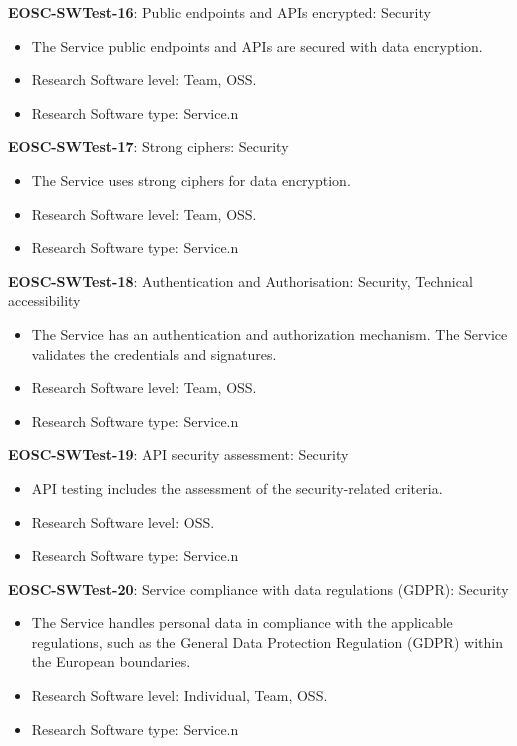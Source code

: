 \textbf{EOSC-SWTest-16}: Public endpoints and APIs encrypted: Security

\begin{itemize}
    \item The Service public endpoints and APIs are secured with data encryption. \cite{orviz_fernandez_eosc-synergy_2020}
    \item Research Software level: Team, OSS.
    \item Research Software type: Service.n\end{itemize}

\textbf{EOSC-SWTest-17}: Strong ciphers: Security

\begin{itemize}
    \item The Service uses strong ciphers for data encryption. \cite{orviz_fernandez_eosc-synergy_2020}
    \item Research Software level: Team, OSS.
    \item Research Software type: Service.n\end{itemize}

\textbf{EOSC-SWTest-18}: Authentication and Authorisation: Security, Technical accessibility

\begin{itemize}
    \item The Service has an authentication and authorization mechanism. The Service validates the credentials and signatures. \cite{shepherdson_cessda_2019,orviz_fernandez_eosc-synergy_2020}
    \item Research Software level: Team, OSS.
    \item Research Software type: Service.n\end{itemize}

\textbf{EOSC-SWTest-19}: API security assessment: Security

\begin{itemize}
    \item API testing includes the assessment of the security-related criteria. \cite{orviz_fernandez_eosc-synergy_2020}
    \item Research Software level: OSS.
    \item Research Software type: Service.n\end{itemize}

\textbf{EOSC-SWTest-20}: Service compliance with data regulations (GDPR): Security

\begin{itemize}
    \item The Service handles personal data in compliance with the applicable regulations, such as the General Data Protection Regulation (GDPR) within the European boundaries. \cite{orviz_fernandez_eosc-synergy_2020}
    \item Research Software level: Individual, Team, OSS.
    \item Research Software type: Service.n\end{itemize}

